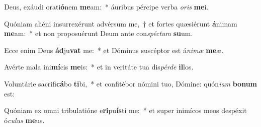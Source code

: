 \item Deus, exáudi orati\textbf{ó}nem \textbf{me}am:~* áuribus pércipe verba \textit{o}\textit{ris} \textbf{me}i.
\item Quóniam aliéni insurrexérunt advérsum me,~† et fortes quæsiérunt \textbf{á}nimam \textbf{me}am:~* et non proposuérunt Deum ante con\textit{spéc}\textit{tum} \textbf{su}um.
\item Ecce enim Deus \textbf{ád}ju\textbf{vat} me:~* et Dóminus suscéptor est á\textit{ni}\textit{mæ} \textbf{me}æ.
\item Avérte mala ini\textbf{mí}cis \textbf{me}is:~* et in veritáte tua dis\textit{pér}\textit{de} \textbf{il}los.
\item Voluntárie sacrifi\textbf{cá}bo \textbf{ti}bi,~* et confitébor nómini tuo, Dómine: quón\textit{i}\textit{am} \textbf{bo}\textbf{num} est:
\item Quóniam ex omni tribulatióne e\textbf{ri}pu\textbf{ís}ti me:~* et super inimícos meos despéxit ó\textit{cu}\textit{lus} \textbf{me}us.
